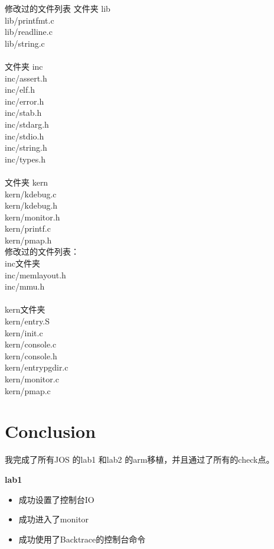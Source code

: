 \documentclass[11pt,a4paper]{article}
\begin{document}
\begin{CJK}{UTF8}{gkai}
			修改过的文件列表
		文件夹 lib\\
		lib/printfmt.c \\
		lib/readline.c \\
		lib/string.c\\ \\
		文件夹 inc\\
		inc/assert.h\\
		inc/elf.h \\
		inc/error.h\\ 
		inc/stab.h \\
		inc/stdarg.h\\ 
		inc/stdio.h \\
		inc/string.h \\
		inc/types.h \\ \\
		文件夹 kern\\
		kern/kdebug.c \\
		kern/kdebug.h \\
		kern/monitor.h \\
		kern/printf.c\\
		kern/pmap.h\\
		
		
		修改过的文件列表：\\
		inc文件夹\\
		inc/memlayout.h\\
		inc/mmu.h\\ \\
		kern文件夹\\
		kern/entry.S\\
		kern/init.c\\
		kern/console.c\\
		kern/console.h\\
		kern/entrypgdir.c\\
		kern/monitor.c\\
		kern/pmap.c  \\
	
\section{Conclusion}
		
		我完成了所有JOS 的lab1 和lab2 的arm移植，并且通过了所有的check点。
		
		\textbf{lab1}
		
		\begin{itemize}
			\item 成功设置了控制台IO
			\item 成功进入了monitor
			\item 成功使用了Backtrace的控制台命令
		\end{itemize} 	
	

\end{CJK}
\end{document}
